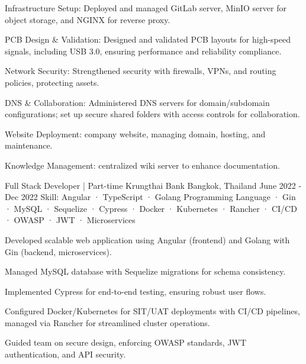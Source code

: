 \begin{cventries}
{\begin{cvitems}
      \item {Infrastructure Setup: Deployed and managed GitLab server, MinIO server for object storage, and NGINX for reverse proxy.}
      \item {PCB Design \& Validation: Designed and validated PCB layouts for high-speed signals, including USB 3.0, ensuring performance and reliability compliance.}
      \item {Network Security: Strengthened security with firewalls, VPNs, and routing policies, protecting assets.}
      \item {DNS \& Collaboration: Administered DNS servers for domain/subdomain configurations; set up secure shared folders with access controls for collaboration.}
      \item {Website Deployment: company website, managing domain, hosting, and maintenance.}
      \item {Knowledge Management: centralized wiki server to enhance documentation.}
      \end{cvitems}
    }

  \cventry
    {Full Stack Developer | Part-time} %
    {Krungthai Bank} %
    {Bangkok, Thailand} %
    {June 2022 - Dec 2022} %
    {Skill: Angular · TypeScript · Golang Programming Language · Gin · MySQL · Sequelize · Cypress · Docker · Kubernetes · Rancher · CI/CD · OWASP · JWT · Microservices} %
    {
    \begin{cvitems} %
      \item {Developed scalable web application using Angular (frontend) and Golang with Gin (backend, microservices).}
      \item {Managed MySQL database with Sequelize migrations for schema consistency.}
      \item {Implemented Cypress for end-to-end testing, ensuring robust user flows.}
      \item {Configured Docker/Kubernetes for SIT/UAT deployments with CI/CD pipelines, managed via Rancher for streamlined cluster operations.}
      \item {Guided team on secure design, enforcing OWASP standards, JWT authentication, and API security.}
    \end{cvitems}
  }


\end{cventries}
